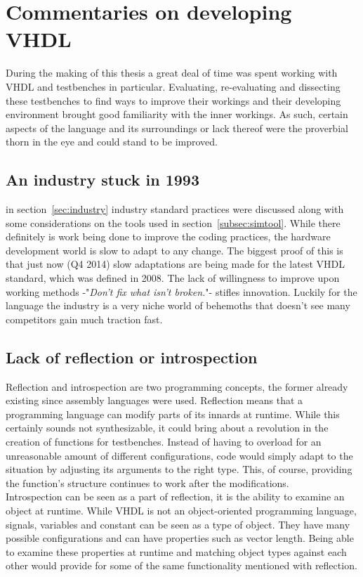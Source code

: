 \documentclass[11pt,british]{article}
\begin{document}
\newpage{}
\section{Commentaries on developing VHDL}
During the making of this thesis a great deal of time was spent working with \gls{VHDL} and testbenches in particular. Evaluating, re-evaluating and dissecting these testbenches to find ways to improve their workings and their developing environment brought good familiarity with the inner workings. As such, certain aspects of the language and its surroundings or lack thereof were the proverbial thorn in the eye and could stand to be improved.

\subsection{An industry stuck in 1993}
\label{subsec:stuck}
in section~\ref{sec:industry} industry standard practices were discussed along with some considerations on the tools used in section~\ref{subsec:simtool}. While there definitely is work being done to improve the coding practices, the hardware development world is slow to adapt to any change. The biggest proof of this is that just now (Q4 2014) slow adaptations are being made for the latest VHDL standard, which was defined in 2008. The lack of willingness to improve upon working methods -"\emph{Don't fix what isn't broken.}"- stifles innovation. Luckily for the language the industry is a very niche world of behemoths that doesn't see many competitors gain much traction fast.

\subsection{Lack of reflection or introspection}
Reflection and introspection are two programming concepts, the former already existing since assembly languages were used. Reflection means that a programming language can modify parts of its innards at runtime. While this certainly sounds not synthesizable, it could bring about a revolution in the creation of functions for testbenches. Instead of having to overload for an unreasonable amount of different configurations, code would simply adapt to the situation by adjusting its arguments to the right type. This, of course, providing the function's structure  continues to work after the modifications.
\\[\baselineskip]
Introspection can be seen as a part of reflection, it is the ability to examine an object at runtime. While VHDL is not an object-oriented programming language, signals, variables and constant can be seen as a type of object. They have many possible configurations and can have  properties such as vector length. Being able to examine these properties at runtime and matching object types against each other would provide for some of the same functionality mentioned with reflection.
\end{document}
